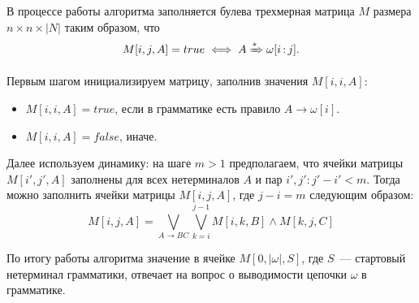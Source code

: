 В процессе работы алгоритма заполняется булева трехмерная матрица $M$ размера $n \times n \times  |N|$ таким образом, что
\[ M[i, j, A] = true \iff A \derives \omega[i \rng j]. \]

Первым шагом инициализируем матрицу, заполнив значения $M[i, i, A]$:
\begin{itemize}
    \item $M[i, i, A] = true$, если в грамматике есть правило $A \to \omega[i]$.
    \item $M[i, i, A] = false$, иначе.
\end{itemize}

Далее используем динамику: на шаге $m > 1$ предполагаем, что ячейки матрицы $M[i', j', A]$ заполнены для всех нетерминалов $A$ и пар $i', j': j' - i' < m$.
Тогда можно заполнить ячейки матрицы $M[i, j, A]$, где $j - i = m$ следующим образом:
\[ M[i, j, A] = \bigvee_{A \to B C} \bigvee_{k = i}^{j-1} M[i, k, B] \wedge M[k, j, C] \]

По итогу работы алгоритма значение в ячейке $M[0, |\omega|, S]$, где $S$~--- стартовый нетерминал грамматики, отвечает на вопрос о выводимости цепочки $\omega$ в грамматике.

